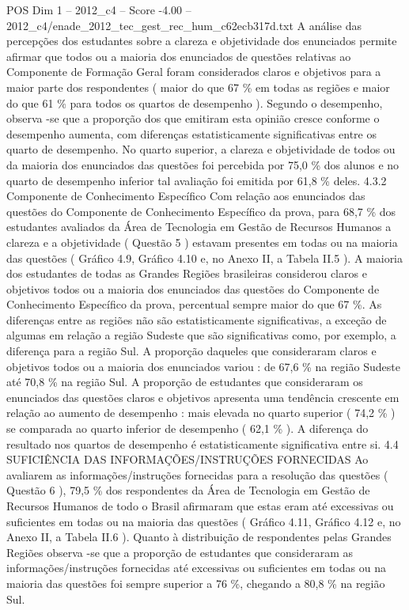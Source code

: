 \begin{textsample}{POS Dim 1 – 2012\_c4 – Score -4.00 – 2012\_c4/enade\_2012\_tec\_gest\_rec\_hum\_c62ecb317d.txt}
A análise das percepções dos estudantes sobre a clareza e objetividade dos enunciados permite afirmar que todos ou a maioria dos enunciados de questões relativas ao Componente de Formação Geral foram considerados claros e objetivos para a maior parte dos respondentes ( maior do que 67 \% em todas as regiões e maior do que 61 \% para todos os quartos de desempenho ).
Segundo o desempenho, observa -se que a proporção dos que emitiram esta opinião cresce conforme o desempenho aumenta, com diferenças estatisticamente significativas entre os quarto de desempenho.
No quarto superior, a clareza e objetividade de todos ou da maioria dos enunciados das questões foi percebida por 75,0 \% dos alunos e no quarto de desempenho inferior tal avaliação foi emitida por 61,8 \% deles. 4.3.2 Componente de Conhecimento Específico Com relação aos enunciados das questões do Componente de Conhecimento Específico da prova, para 68,7 \% dos estudantes avaliados da Área de Tecnologia em Gestão de Recursos Humanos a clareza e a objetividade ( Questão 5 ) estavam presentes em todas ou na maioria das questões ( Gráfico 4.9, Gráfico 4.10 e, no Anexo II, a Tabela II.5 ).
A maioria dos estudantes de todas as Grandes Regiões brasileiras considerou claros e objetivos todos ou a maioria dos enunciados das questões do Componente de Conhecimento Específico da prova, percentual sempre maior do que 67 \%.
As diferenças entre as regiões não são estatisticamente significativas, a exceção de algumas em relação a região Sudeste que são significativas como, por exemplo, a diferença para a região Sul.
A proporção daqueles que consideraram claros e objetivos todos ou a maioria dos enunciados variou : de 67,6 \% na região Sudeste até 70,8 \% na região Sul.
A proporção de estudantes que consideraram os enunciados das questões claros e objetivos apresenta uma tendência crescente em relação ao aumento de desempenho : mais elevada no quarto superior ( 74,2 \% ) se comparada ao quarto inferior de desempenho ( 62,1 \% ).
A diferença do resultado nos quartos de desempenho é estatisticamente significativa entre si. 4.4 SUFICIÊNCIA DAS INFORMAÇÕES/INSTRUÇÕES FORNECIDAS Ao avaliarem as informações/instruções fornecidas para a resolução das questões ( Questão 6 ), 79,5 \% dos respondentes da Área de Tecnologia em Gestão de Recursos Humanos de todo o Brasil afirmaram que estas eram até excessivas ou suficientes em todas ou na maioria das questões ( Gráfico 4.11, Gráfico 4.12 e, no Anexo II, a Tabela II.6 ).
Quanto à distribuição de respondentes pelas Grandes Regiões observa -se que a proporção de estudantes que consideraram as informações/instruções fornecidas até excessivas ou suficientes em todas ou na maioria das questões foi sempre superior a 76 \%, chegando a 80,8 \% na região Sul.

\end{textsample}
